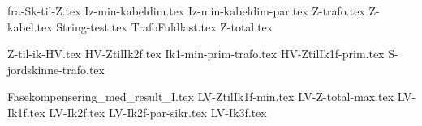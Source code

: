 \usepackage[utf8]{inputenc}%
\usepackage{amsmath}%
\usepackage{mathtools}%
\usepackage{icomma}%
\usepackage{siunitx}%
\usepackage{fp}%
\usepackage{xstring}%
\usepackage{listofitems}
\usepackage{ifthen}
\usepackage{gensymb} %

{fra-Sk-til-Z.tex}
{Iz-min-kabeldim.tex}
{Iz-min-kabeldim-par.tex}
{Z-trafo.tex}
{Z-kabel.tex}
{String-test.tex}
{TrafoFuldlast.tex}
{Z-total.tex}

{Z-til-ik-HV.tex}
{HV-ZtilIk2f.tex}
{Ik1-min-prim-trafo.tex}
{HV-ZtilIk1f-prim.tex}
{S-jordskinne-trafo.tex}

{Fasekompensering_med_result_I.tex}
{LV-ZtilIk1f-min.tex}
{LV-Z-total-max.tex}
{LV-Ik1f.tex}
{LV-Ik2f.tex}
{LV-Ik2f-par-sikr.tex}
{LV-Ik3f.tex}